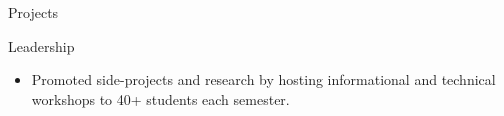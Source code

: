 \documentclass{resume} %
\begin{document}
\begin{workSection}{Projects}
\end{workSection}

\begin{workSection}{Leadership}

    \customItem[
        title=Treasurer - Association for Computing Machinery at UTEP,
        duration=Fall 2022 - Present
    ]
    \begin{itemize}
        \vspace{-0.5em}
        \itemsep -6pt {}
        \item Promoted side-projects and research by hosting informational and technical workshops to 40+ students each semester.
    \end{itemize}
\end{workSection}

\end{document}

